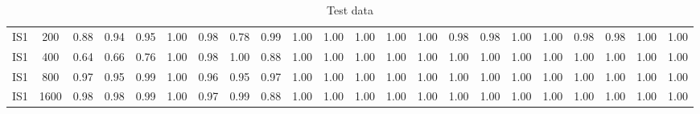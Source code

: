 \documentclass[10pt]{article}
\begin{document}
\begin{table}
\begin{tabular}{ cc||c c c c | c c c c | c c c c | c c c c| c c c c}
 					IS1 & 200 & 0.88 & 0.94 & 0.95 & 1.00 & 0.98 & 0.78 & 0.99 & 1.00& 1.00 & 1.00 & 1.00 & 1.00& 0.98 & 0.98 & 1.00 & 1.00 & 0.98 & 0.98 & 1.00 & 1.00\\ 
 					IS1 & 400 & 0.64 & 0.66 & 0.76 & 1.00 & 0.98 & 1.00 & 0.88 & 1.00& 1.00 & 1.00 & 1.00 & 1.00& 1.00 & 1.00 & 1.00 & 1.00 & 1.00 & 1.00 & 1.00 & 1.00\\ 
 					IS1 & 800 & 0.97 & 0.95 & 0.99 & 1.00 & 0.96 & 0.95 & 0.97 & 1.00& 1.00 & 1.00 & 1.00 & 1.00& 1.00 & 1.00 & 1.00 & 1.00 & 1.00 & 1.00 & 1.00 & 1.00\\ 
 					IS1 & 1600 & 0.98 & 0.98 & 0.99 & 1.00 & 0.97 & 0.99 & 0.88 & 1.00& 1.00 & 1.00 & 1.00 & 1.00& 1.00 & 1.00 & 1.00 & 1.00 & 1.00 & 1.00 & 1.00 & 1.00\\ \hline
 \hline
  \end{tabular}
  \caption{Test data}
\end{table}


\newpage
\end{document}
